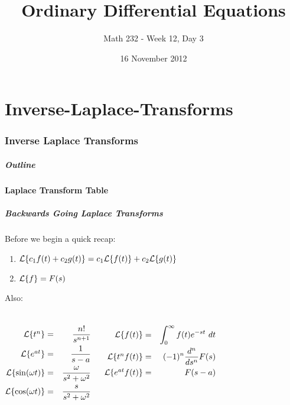 \part{Inverse-Laplace-Transforms}
\section{Inverse Laplace Transforms}


\title{Ordinary Differential Equations}
\subtitle{Math 232 - Week 12, Day 3}
\date{16 November 2012}

\begin{frame}
  \titlepage
\end{frame}

\begin{frame}
  \frametitle{Outline}
\end{frame}


\subsection{Laplace Transform Table}

\begin{frame}
  \frametitle{Backwards Going Laplace Transforms }

  Before we begin a quick recap:
  \begin{enumerate}
  \item $\laplace{c_1 f(t) + c_2 g(t)}=c_1 \laplace{f(t)} + c_2 \laplace{g(t)}$
  \item $\laplace{f}=F(s)$
  \end{enumerate}

  Also:
  \begin{columns}
    \begin{eqnarray*}
      \laplace{t^n}    & = & \frac{n!}{s^{n+1}} \\ 
      \laplace{e^{at}} & = & \frac{1}{s-a} \\ 
      \laplace{\sin(\omega t)} & = & \frac{\omega}{s^2+\omega^2} \\
      \laplace{\cos(\omega t)} & = & \frac{s}{s^2+\omega^2} \\ 
    \end{eqnarray*}

    \begin{eqnarray*}
      \laplace{f(t)}  & = & \int^\infty_0 f(t) e^{-st} ~ dt \\ 
      \laplace{t^nf(t)} & = & (-1)^n\frac{d^n}{ds^n}F(s) \\
      \laplace{e^{at}f(t)} & = & F(s-a) 
    \end{eqnarray*}

  \end{columns}


\end{frame}

